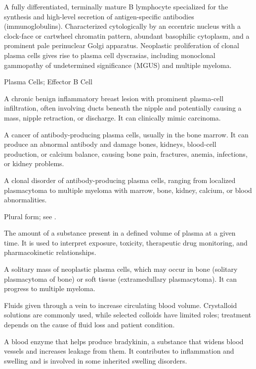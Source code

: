  A fully differentiated, terminally mature B lymphocyte specialized for the synthesis and high-level secretion of antigen-specific antibodies (immunoglobulins). Characterized cytologically by an eccentric nucleus with a clock-face or cartwheel chromatin pattern, abundant basophilic cytoplasm, and a prominent pale perinuclear Golgi apparatus. Neoplastic proliferation of clonal plasma cells gives rise to plasma cell dyscrasias, including monoclonal gammopathy of undetermined significance (MGUS) and multiple myeloma.

\synonyms
Plasma Cells; Effector B Cell

 A chronic benign inflammatory breast lesion with prominent plasma-cell infiltration, often involving ducts beneath the nipple and potentially causing a mass, nipple retraction, or discharge. It can clinically mimic carcinoma.

 A cancer of antibody-producing plasma cells, usually in the bone marrow. It can produce an abnormal antibody and damage bones, kidneys, blood-cell production, or calcium balance, causing bone pain, fractures, anemia, infections, or kidney problems.

 A clonal disorder of antibody-producing plasma cells, ranging from localized plasmacytoma to multiple myeloma with marrow, bone, kidney, calcium, or blood abnormalities.

 Plural form; see .

 The amount of a substance present in a defined volume of plasma at a given time. It is
used to interpret exposure, toxicity, therapeutic drug monitoring, and pharmacokinetic
relationships.

 A solitary mass of neoplastic plasma cells, which may occur in bone (solitary plasmacytoma of bone) or soft tissue (extramedullary plasmacytoma). It can progress to multiple myeloma.

 Fluids given through a vein to increase circulating blood volume. Crystalloid solutions are commonly used, while selected colloids have limited roles; treatment depends on the cause of fluid loss and patient condition.

 A blood enzyme that helps produce bradykinin, a substance that widens blood vessels and increases leakage from them. It contributes to inflammation and swelling and is involved in some inherited swelling disorders.

